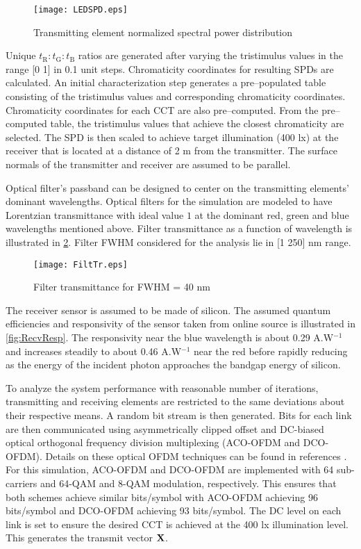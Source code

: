 \begin{figure}[!t]
	\centering
		\texttt{[image: LEDSPD.eps]}
	\caption{Transmitting element normalized spectral power distribution}
	\label{fig:LEDSPD}
\end{figure}

Unique $t_{\text{R}}:t_{\text{G}}:t_{\text{B}}$ ratios are generated after varying the tristimulus values in the range [0 1] in 0.1 unit steps. Chromaticity coordinates for resulting SPDs are calculated. An initial characterization step generates a pre--populated table consisting of the tristimulus values and corresponding chromaticity coordinates. Chromaticity coordinates for each CCT are also pre--computed. From the pre--computed table, the tristimulus values that achieve the closest chromaticity are selected. The SPD is then scaled to achieve target illumination (400 lx) at the receiver that is located at a distance of 2 m from the transmitter. The surface normals of the transmitter and receiver are assumed to be parallel.

Optical filter's passband can be designed to center on the transmitting elements' dominant wavelengths. Optical filters for the simulation are modeled to have Lorentzian transmittance with ideal value $1$ at the dominant red, green and blue wavelengths mentioned above. Filter transmittance as a function of wavelength is illustrated in \figurename{ \ref{fig:FiltTr}}. Filter FWHM considered for the analysis lie in [1 250] nm range.

\begin{figure}[!t]
	\centering
		\texttt{[image: FiltTr.eps]}
	\caption{Filter transmittance for FWHM = 40 nm}
	\label{fig:FiltTr}
\end{figure}

The receiver sensor is assumed to be made of silicon. The assumed quantum efficiencies and responsivity of the sensor taken from online source is illustrated in \figurename{ \ref{fig:RecvResp}}. The responsivity near the blue wavelength is about 0.29 A.W$^{-1}$ and increases steadily to about 0.46 A.W$^{-1}$ near the red before rapidly reducing as the energy of the incident photon approaches the bandgap energy of silicon.

To analyze the system performance with reasonable number of iterations, transmitting and receiving elements are restricted to the same deviations about their respective means. A random bit stream is then generated. Bits for each link are then communicated using asymmetrically clipped offset and DC-biased optical orthogonal frequency division multiplexing (ACO-OFDM and DCO-OFDM). Details on these optical OFDM techniques can be found in references \cite{car96a,arm06a}. For this simulation, ACO-OFDM and DCO-OFDM are implemented with 64 sub-carriers and 64-QAM and 8-QAM modulation, respectively. This ensures that both schemes achieve similar bits/symbol with ACO-OFDM achieving 96 bits/symbol and DCO-OFDM achieving 93 bits/symbol. The DC level on each link is set to ensure the desired CCT is achieved at the 400 lx illumination level. This generates the transmit vector ${\bf{X}}$. 

